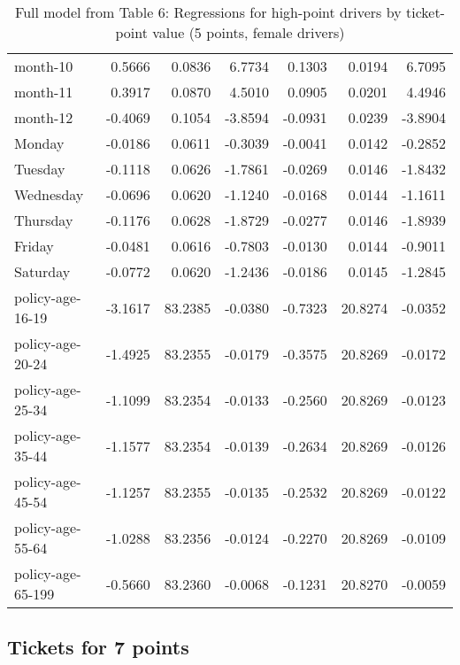 \documentclass[10pt]{article}
\begin{document}
\begin{table}[ht]
\begin{tabular}{lrrrrrr}
  month-10 & 0.5666 & 0.0836 & 6.7734 & 0.1303 & 0.0194 & 6.7095 \\ 
  month-11 & 0.3917 & 0.0870 & 4.5010 & 0.0905 & 0.0201 & 4.4946 \\ 
  month-12 & -0.4069 & 0.1054 & -3.8594 & -0.0931 & 0.0239 & -3.8904 \\ 
  Monday & -0.0186 & 0.0611 & -0.3039 & -0.0041 & 0.0142 & -0.2852 \\ 
  Tuesday & -0.1118 & 0.0626 & -1.7861 & -0.0269 & 0.0146 & -1.8432 \\ 
  Wednesday & -0.0696 & 0.0620 & -1.1240 & -0.0168 & 0.0144 & -1.1611 \\ 
  Thursday & -0.1176 & 0.0628 & -1.8729 & -0.0277 & 0.0146 & -1.8939 \\ 
  Friday & -0.0481 & 0.0616 & -0.7803 & -0.0130 & 0.0144 & -0.9011 \\ 
  Saturday & -0.0772 & 0.0620 & -1.2436 & -0.0186 & 0.0145 & -1.2845 \\ 
  policy-age-16-19 & -3.1617 & 83.2385 & -0.0380 & -0.7323 & 20.8274 & -0.0352 \\ 
  policy-age-20-24 & -1.4925 & 83.2355 & -0.0179 & -0.3575 & 20.8269 & -0.0172 \\ 
  policy-age-25-34 & -1.1099 & 83.2354 & -0.0133 & -0.2560 & 20.8269 & -0.0123 \\ 
  policy-age-35-44 & -1.1577 & 83.2354 & -0.0139 & -0.2634 & 20.8269 & -0.0126 \\ 
  policy-age-45-54 & -1.1257 & 83.2355 & -0.0135 & -0.2532 & 20.8269 & -0.0122 \\ 
  policy-age-55-64 & -1.0288 & 83.2356 & -0.0124 & -0.2270 & 20.8269 & -0.0109 \\ 
  policy-age-65-199 & -0.5660 & 83.2360 & -0.0068 & -0.1231 & 20.8270 & -0.0059 \\ 
   \hline
\end{tabular}
\caption{Full model from Table 6: Regressions for high-point drivers by ticket-point value (5 points, female drivers)} 
\label{tab_6_5_pts_F}
\end{table}


\clearpage
\pagebreak




\subsection{Tickets for 7 points}
\end{document}
